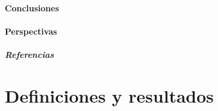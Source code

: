 \documentclass[spanish,10pt,xcolor=dvipsnames,table]{beamer}
\theoremstyle{plain} %
\theoremstyle{definition}
\begin{document}
			\subsection{Conclusiones}
				
			\subsection{Perspectivas}
							 
	\begin{frame}
		\frametitle{Referencias}
		
			\nocite{Buckwar2011a}
			\nocite{Higham2002b}
			\nocite{Mao2013}
			\nocite{Hutzenthaler2015}
		
	\end{frame}
	\appendix
		\part{Definiciones y resultados}
			
\end{document}
